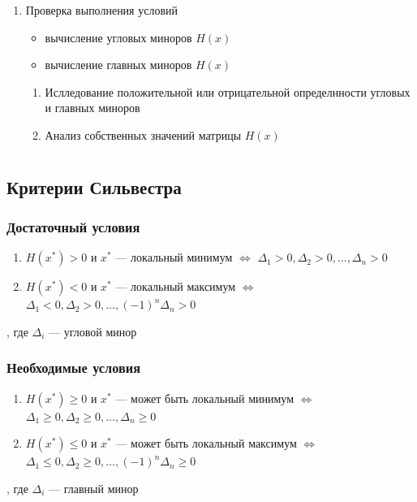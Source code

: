 \documentclass[oneside]{book}
\theoremstyle{plain}
\theoremstyle{remark}
\theoremstyle{definition}
\begin{document}
\begin{enumerate}
\item Проверка выполнения условий
\label{sec:org919ace0}
\begin{itemize}
\item вычисление угловых миноров \(H(x)\)
\item вычисление главных миноров \(H(x)\) \\
\end{itemize}


\begin{enumerate}
\item Ислледование положительной или отрицательной определнности угловых и главных миноров
\item Анализ собственных значений матрицы \(H(x)\)
\end{enumerate}
\end{enumerate}
\chapter{}
\label{sec:orgc32b47e}
\newcommand{\diff}[2]{\frac{\partial #1}{\partial #2}}


\section{Критерии Сильвестра}
\label{sec:orgdce48ae}
\subsection{Достаточный условия}
\label{sec:org6440058}
\begin{enumerate}
\item \(H(x^*) > 0\) и \(x^*\) --- локальный минимум \(\Leftrightarrow\) \(\Delta_1 > 0, \Delta_2 > 0, \dots , \Delta_n > 0\)
\item \(H(x^*) < 0\) и \(x^*\) --- локальный максимум \(\Leftrightarrow\) \(\Delta_1 < 0, \Delta_2 > 0, \dots , (-1)^n\Delta_n > 0\)
\end{enumerate}
, где \(\Delta_i\) --- угловой минор
\subsection{Необходимые условия}
\label{sec:orgc3e7f6a}
\begin{enumerate}
\item \(H(x^*) \ge 0\) и \(x^*\) --- может быть локальный минимум \(\Leftrightarrow\) \(\Delta_1 \ge 0, \Delta_2 \ge 0, \dots, \Delta_n \ge 0\)
\item \(H(x^*) \le 0\) и \(x^*\) --- может быть локальный максимум \(\Leftrightarrow\) \(\Delta_1 \le 0, \Delta_2 \ge 0, \dots, (-1)^n\Delta_n \ge 0\)
\end{enumerate}
, где \(\Delta_i\) --- главный минор
\end{document}
